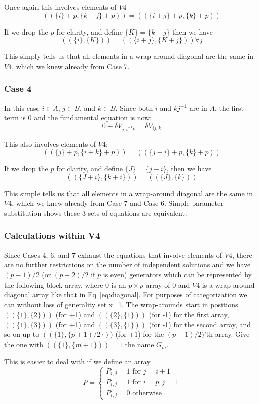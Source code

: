 \documentclass{revtex4-1}
\begin{document}
Once again this involves elements of $V4$
$$(( \{i\}+p, \{k-j\} +p )) = (( \{i+j\}+p, \{k\}+p))$$

If we drop the $p$ for clarity, and define $\{K\} = \{k-j\}$ then we have
$$(( \{i\}, \{K\} )) = (( \{i+j\}, \{K+j\})) \forall j$$

This simply tells us that all elements in a wrap-around diagonal are the 
same in $V4$, which we knew already from Case 7.

\subsubsection{Case 4}
In this case $i \in A$, $j \in B$, and $k \in B$.  Since both $i$ and $kj^{-1}$ are in $A$,
the first term is 0 and the fundamental equation is now:
$$0 + \delta V_{j,i^{-1}k} = \delta V_{ij,k}$$

This also involves elements of $V4$:
$$(( \{j\} +p, \{i+k\}+p )) = (( \{j-i\}+p, \{k\}+p))$$

If we drop the $p$ for clarity, and define $\{J\} = \{j-i\}$, then we have
$$(( \{J+i\}, \{k+i\} )) = (( \{J\}, \{k\} ))$$

This simple tells us that all elements in a wrap-around diagonal are the same
in $V4$, which we knew already from Case 7 and Case 6.  Simple parameter
substitution shows these 3 sets of equations are equivalent.

\subsubsection{Calculations within V4}

Since Cases 4, 6, and 7 exhaust the equations that involve elements of $V4$, there are
no further restrictions on the number of independent solutions and we have
$(p-1)/2$ (or $(p-2)/2$ if $p$ is even) generators which can be represented by the following block array,
where $0$ is an $p\times p$ array of $0$ and $V4$ is a wrap-around diagonal
array like that in Eq~\ref{eq:diagonal}.  For purposes of categorization we can without
loss of generality set x=1.  The wrap-arounds start in positions
$((\{1\},\{2\}))$ (for +1) and $((\{2\},\{1\}))$ (for -1) for the first array, $((\{1\},\{3\}))$ (for +1) 
and $((\{3\},\{1\}))$ (for -1) for the second array, and
so on up to $((\{1\},\{p+1)/2\}))$ (for +1) for the $(p-1)/2)$'th array.  
Give the one with  $((\{1\},\{m+1\}))=1$ the name $G_m$.

This is easier to deal with if we define an array
\begin{equation}
P=
\begin{cases}
P_{i,j} = 1  \text{ for } j=i+1 \\
P_{i,j} = 1  \text{ for } i=p,j=1 \\
P_{i,j} = 0  \text{ otherwise}
\end{cases}
\end{equation}
\end{document}
